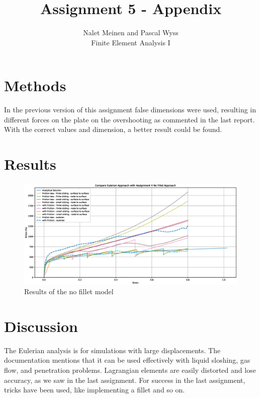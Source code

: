 \documentclass[12pt]{article}
\begin{document}


\title{Assignment 5 - Appendix}%
\author{Nalet Meinen and Pascal Wyss\\ %
Finite Element Analysis I
}
\maketitle

\section{Methods}

In the previous version of this assignment false dimensions were used, resulting in different forces on the plate on the overshooting as commented in the last report. With the correct values and dimension, a better result could be found.

\section{Results}


\begin{figure}[!htb]
  \centering
  \includegraphics[trim={4cm 1cm 4cm 1.8cm},clip,width=0.9\linewidth]{pics/eulerian_compared}
  \caption{Results of the no fillet model}
  \label{fig:3}
\end{figure}

\newpage

\section{Discussion}

The Eulerian analysis is for simulations with large displacements. The documentation mentions that it can be used effectively with liquid sloshing, gas flow, and penetration problems. Lagrangian elements are easily distorted and lose accuracy, as we saw in the last assignment. For success in the last assignment, tricks have been used, like implementing a fillet and so on.
\end{document}
